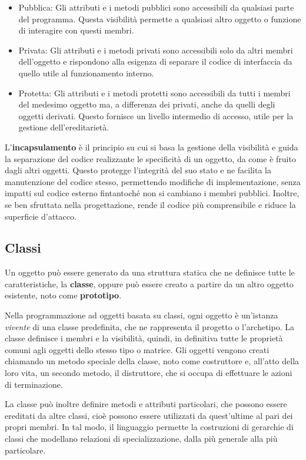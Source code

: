 \documentclass[
  letterpaper,
]{scrbook}
\begin{document}
\begin{itemize}
\item
  Pubblica: Gli attributi e i metodi pubblici sono accessibili da
  qualsiasi parte del programma. Questa visibilità permette a qualsiasi
  altro oggetto o funzione di interagire con questi membri.
\item
  Privata: Gli attributi e i metodi privati sono accessibili solo da
  altri membri dell'oggetto e rispondono alla esigenza di separare il
  codice di interfaccia da quello utile al funzionamento interno.
\item
  Protetta: Gli attributi e i metodi protetti sono accessibili da tutti
  i membri del medesimo oggetto ma, a differenza dei privati, anche da
  quelli degli oggetti derivati. Questo fornisce un livello intermedio
  di accesso, utile per la gestione dell'ereditarietà.
\end{itemize}

L'\textbf{incapsulamento} è il principio su cui si basa la gestione
della visibilità e guida la separazione del codice realizzante le
specificità di un oggetto, da come è fruito dagli altri oggetti. Questo
protegge l'integrità del suo stato e ne facilita la manutenzione del
codice stesso, permettendo modifiche di implementazione, senza impatti
sul codice esterno fintantoché non si cambiano i membri pubblici.
Inoltre, se ben sfruttata nella progettazione, rende il codice più
comprensibile e riduce la superficie d'attacco.

\subsection{Classi}\label{classi}

Un oggetto può essere generato da una struttura statica che ne definisce
tutte le caratteristiche, la \textbf{classe}, oppure può essere creato a
partire da un altro oggetto esistente, noto come \textbf{prototipo}.

Nella programmazione ad oggetti basata su classi, ogni oggetto è
un'istanza \emph{vivente} di una classe predefinita, che ne rappresenta
il progetto o l'archetipo. La classe definisce i membri e la visibilità,
quindi, in definitiva tutte le proprietà comuni agli oggetti dello
stesso tipo o matrice. Gli oggetti vengono creati chiamando un metodo
speciale della classe, noto come costruttore e, all'atto della loro
vita, un secondo metodo, il distruttore, che si occupa di effettuare le
azioni di terminazione.

La classe può inoltre definire metodi e attributi particolari, che
possono essere ereditati da altre classi, cioè possono essere utilizzati
da quest'ultime al pari dei propri membri. In tal modo, il linguaggio
permette la costruzioni di gerarchie di classi che modellano relazioni
di specializzazione, dalla più generale alla più particolare.
\end{document}
